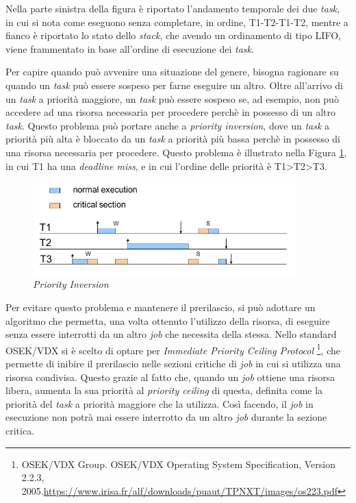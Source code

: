 \documentclass{article}
\begin{document}
Nella parte sinistra della figura è riportato l'andamento temporale dei due \textit{task}, in cui si nota come eseguono senza completare, in ordine, T1-T2-T1-T2, mentre a fianco è riportato lo stato dello \textit{stack}, che avendo un ordinamento di tipo LIFO, viene frammentato in base all'ordine di esecuzione dei \textit{task}. 

Per capire quando può avvenire una situazione del genere, bisogna ragionare su quando un \textit{task} può essere sospeso per farne eseguire un altro. Oltre all'arrivo di un \textit{task} a priorità maggiore, un \textit{task} può essere sospeso se, ad esempio, non può accedere ad una risorsa necessaria per procedere perchè in possesso di un altro \textit{task}. Questo problema può portare anche a \textit{priority inversion}, dove un \textit{task} a priorità più alta è bloccato da un \textit{task} a priorità più bassa perchè in possesso di una risorsa necessaria per procedere. Questo problema è illustrato nella Figura \ref{priority-inversion}, in cui T1 ha una \textit{deadline miss}, e in cui l'ordine delle priorità è T1>T2>T3.

\begin{figure}[H]
	\centering
	\includegraphics[width=4in]{image/Priority_inversion.png}
	\caption{\textit{\textit{Priority Inversion}}}
	\label{priority-inversion}
\end{figure}

Per evitare questo problema e mantenere il prerilascio, si può adottare un algoritmo che permetta, una volta ottenuto l'utilizzo della risorsa, di eseguire senza essere interrotti da un altro \textit{job} che necessita della stessa. Nello standard OSEK/VDX si è scelto di optare per \textit{Immediate Priority Ceiling Protocol} \footnote{OSEK/VDX Group. OSEK/VDX Operating System Specification, Version 2.2.3, 2005.\url{https://www.irisa.fr/alf/downloads/puaut/TPNXT/images/os223.pdf}}, che permette di inibire il prerilascio nelle sezioni critiche di \textit{job} in cui si utilizza una risorsa condivisa. Questo grazie al fatto che, quando un \textit{job} ottiene una risorsa libera, aumenta la sua priorità al \textit{priority ceiling} di questa, definita come la priorità del \textit{task} a priorità maggiore che la utilizza. Così facendo, il \textit{job} in esecuzione non potrà mai essere interrotto da un altro \textit{job} durante la sezione critica.
\end{document}
